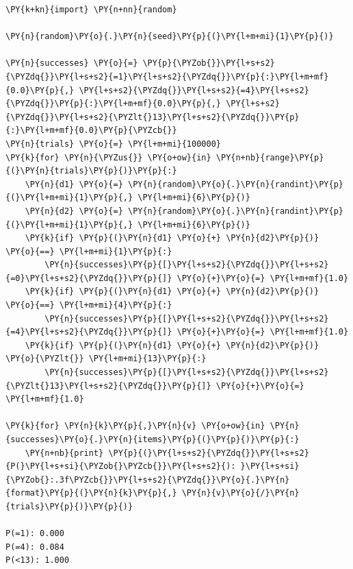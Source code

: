 \begin{Answer}
\begin{tcolorbox}[size=fbox, boxrule=1pt, colback=cellbackground, colframe=cellborder]
\begin{Verbatim}[commandchars=\\\{\}]
\PY{k+kn}{import} \PY{n+nn}{random}
	
\PY{n}{random}\PY{o}{.}\PY{n}{seed}\PY{p}{(}\PY{l+m+mi}{1}\PY{p}{)}
	
\PY{n}{successes} \PY{o}{=} \PY{p}{\PYZob{}}\PY{l+s+s2}{\PYZdq{}}\PY{l+s+s2}{=1}\PY{l+s+s2}{\PYZdq{}}\PY{p}{:}\PY{l+m+mf}{0.0}\PY{p}{,} \PY{l+s+s2}{\PYZdq{}}\PY{l+s+s2}{=4}\PY{l+s+s2}{\PYZdq{}}\PY{p}{:}\PY{l+m+mf}{0.0}\PY{p}{,} \PY{l+s+s2}{\PYZdq{}}\PY{l+s+s2}{\PYZlt{}13}\PY{l+s+s2}{\PYZdq{}}\PY{p}{:}\PY{l+m+mf}{0.0}\PY{p}{\PYZcb{}}
\PY{n}{trials} \PY{o}{=} \PY{l+m+mi}{100000}
\PY{k}{for} \PY{n}{\PYZus{}} \PY{o+ow}{in} \PY{n+nb}{range}\PY{p}{(}\PY{n}{trials}\PY{p}{)}\PY{p}{:}
    \PY{n}{d1} \PY{o}{=} \PY{n}{random}\PY{o}{.}\PY{n}{randint}\PY{p}{(}\PY{l+m+mi}{1}\PY{p}{,} \PY{l+m+mi}{6}\PY{p}{)}
    \PY{n}{d2} \PY{o}{=} \PY{n}{random}\PY{o}{.}\PY{n}{randint}\PY{p}{(}\PY{l+m+mi}{1}\PY{p}{,} \PY{l+m+mi}{6}\PY{p}{)}
    \PY{k}{if} \PY{p}{(}\PY{n}{d1} \PY{o}{+} \PY{n}{d2}\PY{p}{)} \PY{o}{==} \PY{l+m+mi}{1}\PY{p}{:}
        \PY{n}{successes}\PY{p}{[}\PY{l+s+s2}{\PYZdq{}}\PY{l+s+s2}{=0}\PY{l+s+s2}{\PYZdq{}}\PY{p}{]} \PY{o}{+}\PY{o}{=} \PY{l+m+mf}{1.0}
    \PY{k}{if} \PY{p}{(}\PY{n}{d1} \PY{o}{+} \PY{n}{d2}\PY{p}{)} \PY{o}{==} \PY{l+m+mi}{4}\PY{p}{:}
        \PY{n}{successes}\PY{p}{[}\PY{l+s+s2}{\PYZdq{}}\PY{l+s+s2}{=4}\PY{l+s+s2}{\PYZdq{}}\PY{p}{]} \PY{o}{+}\PY{o}{=} \PY{l+m+mf}{1.0}
    \PY{k}{if} \PY{p}{(}\PY{n}{d1} \PY{o}{+} \PY{n}{d2}\PY{p}{)} \PY{o}{\PYZlt{}} \PY{l+m+mi}{13}\PY{p}{:}
        \PY{n}{successes}\PY{p}{[}\PY{l+s+s2}{\PYZdq{}}\PY{l+s+s2}{\PYZlt{}13}\PY{l+s+s2}{\PYZdq{}}\PY{p}{]} \PY{o}{+}\PY{o}{=} \PY{l+m+mf}{1.0}
	
\PY{k}{for} \PY{n}{k}\PY{p}{,}\PY{n}{v} \PY{o+ow}{in} \PY{n}{successes}\PY{o}{.}\PY{n}{items}\PY{p}{(}\PY{p}{)}\PY{p}{:}
    \PY{n+nb}{print} \PY{p}{(}\PY{l+s+s2}{\PYZdq{}}\PY{l+s+s2}{P(}\PY{l+s+si}{\PYZob{}\PYZcb{}}\PY{l+s+s2}{): }\PY{l+s+si}{\PYZob{}:.3f\PYZcb{}}\PY{l+s+s2}{\PYZdq{}}\PY{o}{.}\PY{n}{format}\PY{p}{(}\PY{n}{k}\PY{p}{,} \PY{n}{v}\PY{o}{/}\PY{n}{trials}\PY{p}{)}\PY{p}{)}
	
P(=1): 0.000
P(=4): 0.084
P(<13): 1.000
\end{Verbatim}
\end{tcolorbox}
\end{Answer}

